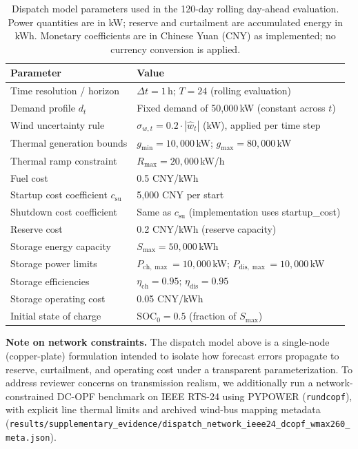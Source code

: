 \documentclass[review,3p,times]{elsarticle}
\begin{document}
\begin{table}[t]
\centering
\caption{Dispatch model parameters used in the 120-day rolling day-ahead evaluation. Power quantities are in kW; reserve and curtailment are accumulated energy in kWh. Monetary coefficients are in Chinese Yuan (CNY) as implemented; no currency conversion is applied.}
\label{tab:dispatch_params}
\begin{tabular}{ll}
\toprule
Parameter & Value \\
\midrule
Time resolution / horizon & $\Delta t=1$\,h; $T=24$ (rolling evaluation) \\
Demand profile $d_t$ & Fixed demand of 50{,}000\,kW (constant across $t$) \\
Wind uncertainty rule & $\sigma_{w,t}=0.2\cdot|\hat{w}_t|$ (kW), applied per time step \\
Thermal generation bounds & $g_{\min}=10{,}000$\,kW; $g_{\max}=80{,}000$\,kW \\
Thermal ramp constraint & $R_{\max}=20{,}000$\,kW/h \\
Fuel cost & 0.5 CNY/kWh \\
Startup cost coefficient $c_{\text{su}}$ & 5{,}000 CNY per start \\
Shutdown cost coefficient & Same as $c_{\text{su}}$ (implementation uses startup\_cost) \\
Reserve cost & 0.2 CNY/kWh (reserve capacity) \\
Storage energy capacity & $S_{\max}=50{,}000$\,kWh \\
Storage power limits & $P_{\text{ch},\max}=10{,}000$\,kW; $P_{\text{dis},\max}=10{,}000$\,kW \\
Storage efficiencies & $\eta_{\text{ch}}=0.95$; $\eta_{\text{dis}}=0.95$ \\
Storage operating cost & 0.05 CNY/kWh \\
Initial state of charge & $\text{SOC}_0=0.5$ (fraction of $S_{\max}$) \\
\bottomrule
\end{tabular}
\end{table}

\noindent\textbf{Note on network constraints.}
The dispatch model above is a single-node (copper-plate) formulation intended to isolate how forecast errors propagate to reserve, curtailment, and operating cost under a transparent parameterization. To address reviewer concerns on transmission realism, we additionally run a network-constrained DC-OPF benchmark on IEEE RTS-24 using PYPOWER (\texttt{rundcopf}), with explicit line thermal limits and archived wind-bus mapping metadata (\texttt{results/supplementary\_evidence/dispatch\_network\_ieee24\_dcopf\_wmax260\_meta.json}).
\end{document}
